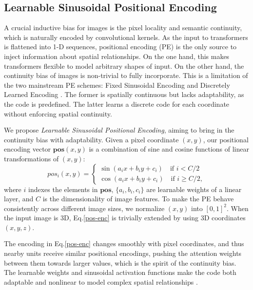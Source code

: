 \documentclass{article}
\begin{document}
\subsection{Learnable Sinusoidal Positional Encoding}
A crucial inductive bias for images is the pixel locality and semantic continuity, which is naturally encoded by convolutional kernels. As the input to transformers is flattened into 1-D sequences, positional encoding (PE) is the only source to inject information about spatial relationships. On the one hand, this makes transformers flexible to model arbitrary shapes of input. On the other hand, the continuity bias of images is non-trivial to fully incorporate. This is a limitation of the two mainstream PE schemes: Fixed Sinusoidal Encoding and Discretely Learned Encoding \cite{detr,vision-trans}. The former is spatially continuous but lacks adaptability, as the code is predefined. The latter learns a discrete code for each coordinate without enforcing spatial continuity.

We propose \emph{Learnable Sinusoidal Positional Encoding}, aiming to bring in the continuity bias with adaptability. 
Given a pixel coordinate $(x,y)$, our positional encoding vector $\boldsymbol{pos}(x,y)$ is a combination of sine and cosine functions of linear transformations of $(x,y)$:
\begin{equation}
pos_i(x,y) = \begin{cases}
\sin(a_i x + b_i y + c_i) \quad \text{if } i < C/2 \\
\cos(a_i x + b_i y + c_i) \quad \text{if } i \ge C/2, 
\end{cases}\label{pos-enc}
\end{equation}
where $i$ indexes the elements in $\boldsymbol{pos}$, $\{a_i,b_i,c_i\}$ are learnable weights of a linear layer, and $C$ is the dimensionality of image features. To make the PE behave consistently across different image sizes, we normalize $(x,y)$ into $[0, 1]^2$. When the input image is 3D, Eq.\eqref{pos-enc} is trivially extended by using 3D coordinates $(x,y,z)$.

The encoding in Eq.\eqref{pos-enc} changes smoothly with pixel coordinates, and thus nearby units receive similar positional encodings, pushing the attention weights between them towards larger values, which is the spirit of the continuity bias. The learnable weights and sinusoidal activation functions make the code both adaptable and nonlinear to model complex spatial relationships \cite{fourier}. 
\end{document}
